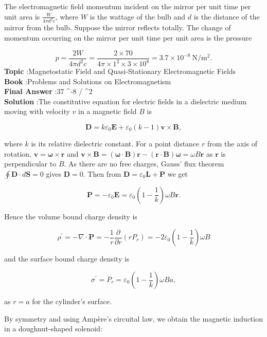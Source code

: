 \documentclass[10pt]{article}
\begin{document}
 The electromagnetic field momentum incident on the mirror per unit time per unit area is $\frac{W}{4 \pi d^{2} c}$, where $W$ is the wattage of the bulb and $d$ is the distance of the mirror from the bulb. Suppose the mirror reflects totally. The change of momentum occurring on the mirror per unit time per unit area is the pressure

$$
p=\frac{2 W}{4 \pi d^{2} c}=\frac{2 \times 70}{4 \pi \times 1^{2} \times 3 \times 10^{8}}=3.7 \times 10^{-8} \mathrm{~N} / \mathrm{m}^{2} .
$$
\textbf{Topic} :Magnetostatic Field and Quasi-Stationary Electromagnetic Fields\\
\textbf{Book} :Problems and Solutions on Electromagnetism\\
\textbf{Final Answer} :37 ^{-8}  / ^{2}\\


\textbf{Solution} :The constitutive equation for electric fields in a dielectric medium moving with velocity $v$ in a magnetic field $B$ is

$$
\mathbf{D}=k \varepsilon_{0} \mathbf{E}+\varepsilon_{0}(k-1) \mathbf{v} \times \mathbf{B},
$$

where $k$ is its relative dielectric constant. For a point distance $r$ from the axis of rotation, $\mathbf{v}=\boldsymbol{\omega} \times \mathbf{r}$ and $\mathbf{v} \times \mathbf{B}=(\boldsymbol{\omega} \cdot \mathbf{B}) \mathbf{r}-(\mathbf{r} \cdot \mathbf{B}) \boldsymbol{\omega}=\omega B \mathbf{r}$ as $\mathbf{r}$ is perpendicular to $B$. As there are no free charges, Gauss' flux theorem $\oint \mathbf{D} \cdot d \mathbf{S}=0$ gives $\mathbf{D}=0$. Then from $\mathbf{D}=\varepsilon_{0} \mathbf{L}+\mathbf{P}$ we get

$$
\mathbf{P}=-\varepsilon_{0} \mathbf{E}=\varepsilon_{0}\left(1-\frac{1}{k}\right) \omega B \mathbf{r} .
$$

Hence the volume bound charge density is

$$
\rho^{\prime}=-\nabla \cdot \mathbf{P}=-\frac{1}{r} \frac{\partial}{\partial r}\left(r P_{r}\right)=-2 \varepsilon_{0}\left(1-\frac{1}{k}\right) \omega B
$$

and the surface bound charge density is

$$
\sigma^{\prime}=P_{r}=\varepsilon_{0}\left(1-\frac{1}{k}\right) \omega B a,
$$

as $r=a$ for the cylinder's surface.

 By symmetry and using Ampère's circuital law, we obtain the magnetic induction in a doughnut-shaped solenoid:
\end{document}

